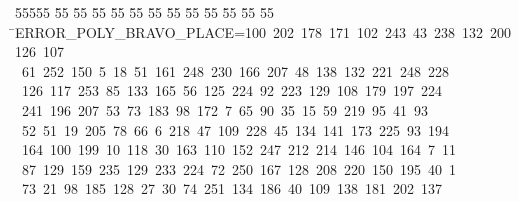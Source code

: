 %
%
\begin{tabbing}
55555 \= 55 \= 55 \= 55 \= 55 \= 55 \= 55 \= 55 \= 55 \= 55 \= 55 \= 55 \= 55 \= \>ERROR\_POLY\_BRAVO\_PLACE=100\ 202\ 178\ 171\ 102\ 243\ 43\ 238\ 132\ 200\ 126\ 107\\[0pt]
\>\ 61\ 252\ 150\ 5\ 18\ 51\ 161\ 248\ 230\ 166\ 207\ 48\ 138\ 132\ 221\ 248\ 228\ \\[0pt]
\ 126\ 117\ 253\ 85\ 133\ 165\ 56\ 125\ 224\ 92\ 223\ 129\ 108\ 179\ 197\ 224\ \\[0pt]
\ 241\ 196\ 207\ 53\ 73\ 183\ 98\ 172\ 7\ 65\ 90\ 35\ 15\ 59\ 219\ 95\ 41\ 93\\[0pt]
\>\ 52\ 51\ 19\ 205\ 78\ 66\ 6\ 218\ 47\ 109\ 228\ 45\ 134\ 141\ 173\ 225\ 93\ 194\ \\[0pt]
\ 164\ 100\ 199\ 10\ 118\ 30\ 163\ 110\ 152\ 247\ 212\ 214\ 146\ 104\ 164\ 7\ 11\\[0pt]
\ 87\ 129\ 159\ 235\ 129\ 233\ 224\ 72\ 250\ 167\ 128\ 208\ 220\ 150\ 195\ 40\ 1\\[0pt]
\ 73\ 21\ 98\ 185\ 128\ 27\ 30\ 74\ 251\ 134\ 186\ 40\ 109\ 138\ 181\ 202\ 137\\[0pt]

\end{tabbing}
